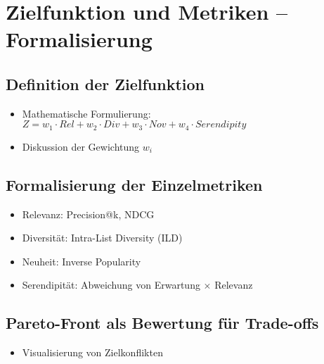 \section{Zielfunktion und Metriken – Formalisierung}

\subsection{Definition der Zielfunktion}
\begin{itemize}
    \item Mathematische Formulierung: \\
    $Z = w_1 \cdot Rel + w_2 \cdot Div + w_3 \cdot Nov + w_4 \cdot Serendipity$
    \item Diskussion der Gewichtung $w_i$
\end{itemize}

\subsection{Formalisierung der Einzelmetriken}
\begin{itemize}
    \item Relevanz: Precision@k, NDCG
    \item Diversität: Intra-List Diversity (ILD)
    \item Neuheit: Inverse Popularity
    \item Serendipität: Abweichung von Erwartung $\times$ Relevanz
\end{itemize}

\subsection{Pareto-Front als Bewertung für Trade-offs}
\begin{itemize}
    \item Visualisierung von Zielkonflikten
\end{itemize}